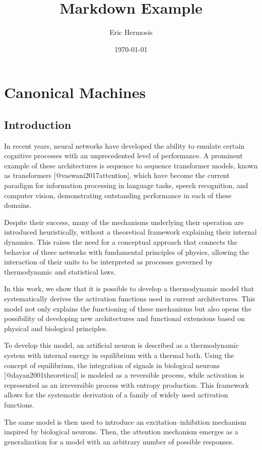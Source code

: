 \documentclass[12pt]{article}
\title{Markdown Example}
\author{Eric Hermosis}
\date{\today}
\begin{document}
\maketitle
\section{Canonical Machines}

\subsection{Introduction}

In recent years, neural networks have developed the ability to emulate certain cognitive processes with an unprecedented level of performance. A prominent example of these architectures is sequence to sequence transformer models, known as transformers [@vaswani2017attention], which have become the current paradigm for information processing in language tasks, speech recognition, and computer vision, demonstrating outstanding performance in each of these domains.

Despite their success, many of the mechanisms underlying their operation are introduced heuristically, without a theoretical framework explaining their internal dynamics. This raises the need for a conceptual approach that connects the behavior of these networks with fundamental principles of physics, allowing the interaction of their units to be interpreted as processes governed by thermodynamic and statistical laws.

In this work, we show that it is possible to develop a thermodynamic model that systematically derives the activation functions used in current architectures. This model not only explains the functioning of these mechanisms but also opens the possibility of developing new architectures and functional extensions based on physical and biological principles.

To develop this model, an artificial neuron is described as a thermodynamic system with internal energy in equilibrium with a thermal bath. Using the concept of equilibrium, the integration of signals in biological neurons [@dayan2001theoretical]  is modeled as a reversible process, while activation is represented as an irreversible  process with entropy production. This framework allows for the systematic derivation of a family of widely used activation functions.

The same model is then used to introduce an excitation–inhibition mechanism inspired by biological neurons. Then, the attention mechanism emerges as a generalization for a model with an arbitrary number of possible responses.
\end{document}
